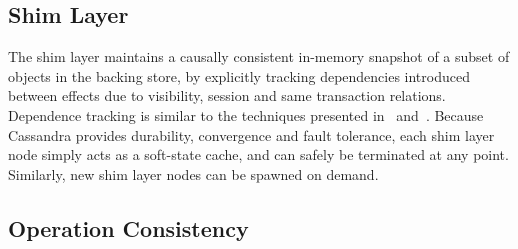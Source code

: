 
\subsection{Shim Layer}

The shim layer maintains a causally consistent in-memory snapshot of a
subset of objects in the backing store, by explicitly tracking dependencies
introduced between effects due to visibility, session and same transaction
relations.  Dependence tracking is similar to the techniques presented
in~\cite{BoltOn} and~\cite{Eiger}. Because Cassandra provides durability,
convergence and fault tolerance, each shim layer node simply acts as a
soft-state cache, and can safely be terminated at any point. Similarly, new
shim layer nodes can be spawned on demand.

\subsection{Operation Consistency}


